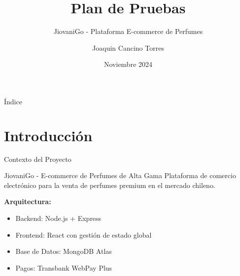 \documentclass[aspectratio=169]{beamer}
\title{Plan de Pruebas}
\subtitle{JiovaniGo - Plataforma E-commerce de Perfumes}
\author{Joaquin Cancino Torres}
\institute{Universidad Católica del Maule \\ Ingeniería Civil Informática}
\date{Noviembre 2024}
\begin{document}
\begin{frame}
\titlepage
\end{frame}

\begin{frame}{Índice}
\tableofcontents
\end{frame}

\section{Introducción}

\begin{frame}{Contexto del Proyecto}
\begin{block}{JiovaniGo - E-commerce de Perfumes de Alta Gama}
Plataforma de comercio electrónico para la venta de perfumes premium en el mercado chileno.
\end{block}

\vspace{0.5cm}

\textbf{Arquitectura:}
\begin{itemize}
    \item \textcolor{goldprimary}{\faServer} Backend: Node.js + Express
    \item \textcolor{accentblue}{\faReact} Frontend: React con gestión de estado global
    \item \textcolor{successgreen}{\faDatabase} Base de Datos: MongoDB Atlas
    \item \textcolor{goldsecondary}{\faCreditCard} Pagos: Transbank WebPay Plus
\end{itemize}
\end{frame}
\end{document}
